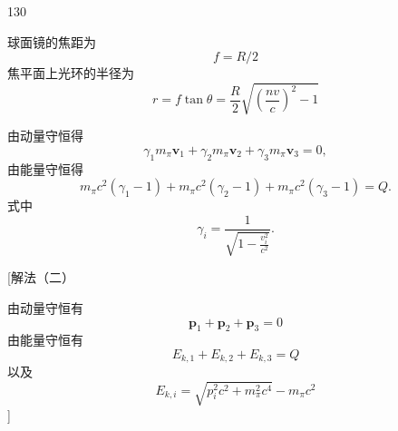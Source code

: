 \begin{solution}{130}
    \begin{subsolution}
        球面镜的焦距为
        \begin{equation}
            f = R / 2
            \label{eq:12.s130}
        \end{equation}
        焦平面上光环的半径为
        \begin{equation}
            r = f \tan \theta = \frac {R}{2} \sqrt {\left(\frac {n v}{c}\right) ^ {2} - 1}
            \label{eq:13.s130}
        \end{equation}
    \end{subsolution}
    \begin{subsolution}
        由动量守恒得
        \begin{equation}
            \gamma_ {1} m _ {\pi} \boldsymbol {v} _ {1} + \gamma_ {2} m _ {\pi} \boldsymbol {v} _ {2} + \gamma_ {3} m _ {\pi} \boldsymbol {v} _ {3} = 0,
            \label{eq:14.s130}
        \end{equation}
        由能量守恒得
        \begin{equation}
            m _ {\pi} c ^ {2} \left(\gamma_ {1} - 1\right) + m _ {\pi} c ^ {2} \left(\gamma_ {2} - 1\right) + m _ {\pi} c ^ {2} \left(\gamma_ {3} - 1\right) = Q.
            \label{eq:15.s130}
        \end{equation}
        式中
        \begin{equation}
            \gamma_ {i} = \frac {1}{\sqrt {1 - \frac {v _ {i} ^ {2}}{c ^ {2}}}}.
            \label{eq:16.s130}
        \end{equation}

        [解法（二）

        由动量守恒有
        \begin{equation}
            \boldsymbol {p} _ {1} + \boldsymbol {p} _ {2} + \boldsymbol {p} _ {3} = 0
            \label{eq:17.s130}
        \end{equation}
        由能量守恒有
        \begin{equation}
            E _ {k, 1} + E _ {k, 2} + E _ {k, 3} = Q
            \label{eq:18.s130}
        \end{equation}
        以及
        \begin{equation}
            E _ {k, i} = \sqrt {p _ {i} ^ {2} c ^ {2} + m _ {\pi} ^ {2} c ^ {4}} - m _ {\pi} c ^ {2}
            \label{eq:19.s130}
        \end{equation}
        ]


\end{subsolution}
\end{solution}
